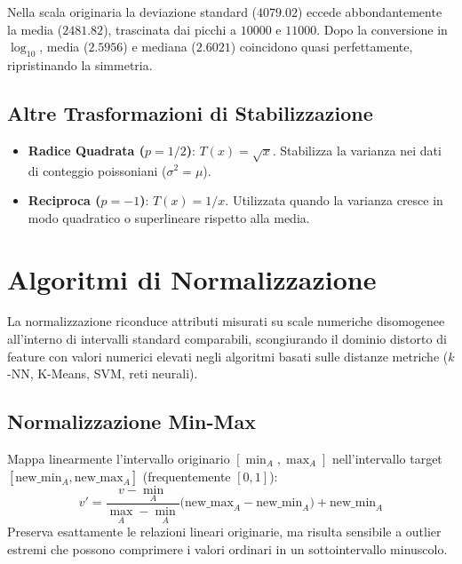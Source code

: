 Nella scala originaria la deviazione standard ($4079.02$) eccede abbondantemente la media ($2481.82$), trascinata dai picchi a $10000$ e $11000$. Dopo la conversione in $\log_{10}$, media ($2.5956$) e mediana ($2.6021$) coincidono quasi perfettamente, ripristinando la simmetria.

\FloatBarrier
\subsection{Altre Trasformazioni di Stabilizzazione}
\begin{itemize}[noitemsep]
    \item \textbf{Radice Quadrata ($p = 1/2$)}: $T(x) = \sqrt{x}$. Stabilizza la varianza nei dati di conteggio poissoniani ($\sigma^2 = \mu$).
    \item \textbf{Reciproca ($p = -1$)}: $T(x) = 1/x$. Utilizzata quando la varianza cresce in modo quadratico o superlineare rispetto alla media.
\end{itemize}

\FloatBarrier
\section{Algoritmi di Normalizzazione}
\label{sec:dm-normalization-algorithms}

La normalizzazione riconduce attributi misurati su scale numeriche disomogenee all'interno di intervalli standard comparabili, scongiurando il dominio distorto di feature con valori numerici elevati negli algoritmi basati sulle distanze metriche ($k$-NN, K-Means, SVM, reti neurali).

\FloatBarrier
\subsection{Normalizzazione Min-Max}
Mappa linearmente l'intervallo originario $[\min_A, \max_A]$ nell'intervallo target $[\text{new\_min}_A, \text{new\_max}_A]$ (frequentemente $[0, 1]$):
\begin{equation}
    v' = \frac{v - \min_A}{\max_A - \min_A} \big(\text{new\_max}_A - \text{new\_min}_A\big) + \text{new\_min}_A
\end{equation}
Preserva esattamente le relazioni lineari originarie, ma risulta sensibile a outlier estremi che possono comprimere i valori ordinari in un sottointervallo minuscolo.

